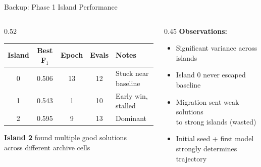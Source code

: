 \documentclass[aspectratio=169,12pt]{beamer}
\begin{document}
\begin{frame}{Backup: Phase 1 Island Performance}
  \begin{columns}[T]
    \begin{column}{0.52\textwidth}
      {\small
      \begin{table}
        \centering
        \begin{tabular}{@{}ccccl@{}}
          \toprule
          Island & Best F$_1$ & Epoch & Evals & Notes \\
          \midrule
          0 & 0.506 & 13 & 12 & Stuck near baseline \\
          1 & 0.543 & 1 & 10 & Early win, stalled \\
          \rowcolor{cbGreen!15}
          2 & \alert{0.595} & 9 & 13 & Dominant \\
          \bottomrule
        \end{tabular}
      \end{table}
      }

      \vspace{0.3em}
      \textbf{Island 2} found multiple good solutions\\
      across different archive cells
    \end{column}
    \begin{column}{0.45\textwidth}
      \textbf{Observations:}
      \begin{itemize}
        \item Significant variance across islands
        \item Island 0 never escaped baseline
        \item Migration sent weak solutions\\
              to strong islands (wasted)
        \item Initial seed + first model\\
              strongly determines trajectory
      \end{itemize}
    \end{column}
  \end{columns}
\end{frame}

\end{document}
